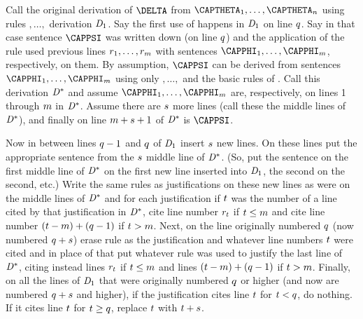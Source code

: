 \begin{PROOF}
Call the original derivation of $\DELTA$ from $\CAPTHETA_1,\ldots,\CAPTHETA_{\integer{n}}$ using rules $,\ldots,$ derivation $\mathit{D}_1$. 
Say the first use of  happens in $\mathit{D}_1$ on line $q$. 
Say in that case sentence $\CAPPSI$ was written down (on line $q$) and the application of the rule used previous lines $r_1,\ldots,r_{m}$ with sentences $\CAPPHI_1,\ldots,\CAPPHI_{\integer{m}}$, respectively, on them. 
By assumption, $\CAPPSI$ can be derived from sentences $\CAPPHI_1,\ldots,\CAPPHI_{\integer{m}}$ using only $,\ldots,$ and the basic rules of \GSD{}. Call this derivation $\mathit{D}^*$ and assume $\CAPPHI_1,\ldots,\CAPPHI_{\integer{m}}$ are, respectively, on lines 1 through $m$ in $\mathit{D}^*$. Assume there are $s$ more lines (call these the middle lines of $\mathit{D}^*$), and finally on line $m+s+1$ of $\mathit{D}^*$ is $\CAPPSI$.

Now in between lines $q-1$ and $q$ of $\mathit{D}_1$ insert $s$ new lines. 
On these lines put the appropriate sentence from the $s$ middle line of $\mathit{D}^*$. 
(So, put the sentence on the first middle line of $\mathit{D}^*$ on the first new line inserted into $\mathit{D}_1$, the second on the second, etc.) 
Write the same rules as justifications on these new lines as were on the middle lines of $\mathit{D}^*$ and for each justification if $t$ was the number of a line cited by that justification in $\mathit{D}^*$, cite line number $r_t$ if $t\leq m$ and cite line number $(t-m)+(q-1)$ if $t>m$. 
Next, on the line originally numbered $q$ (now numbered $q+s$) erase rule  as the justification and whatever line numbers $t$ were cited and in place of that put whatever rule was used to justify the last line of $\mathit{D}^*$, citing instead lines $r_t$ if $t\leq m$ and lines $(t-m)+(q-1)$ if $t>m$.
Finally, on all the lines of $\mathit{D}_1$ that were originally numbered $q$ or higher (and now are numbered $q+s$ and higher), if the justification cites line $t$ for $t<q$, do nothing. 
If it cites line $t$ for $t\geq q$, replace $t$ with $t+s$. 


\end{PROOF}

